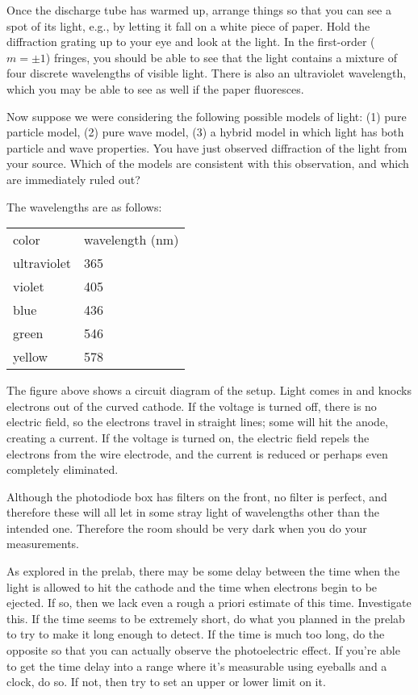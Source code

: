 Once the discharge tube has warmed up, arrange things so that you can see a spot of its light, e.g., by
letting it fall on a white piece of paper. Hold the diffraction grating up to your eye and look at the
light. In the first-order ($m=\pm1$) fringes, you should be able to see that the light contains a
mixture of four discrete wavelengths of visible light. There is also an ultraviolet wavelength,
which you may be able to see as well if the paper fluoresces.

Now suppose we were considering the following possible models of light: (1) pure particle model,
(2) pure wave model, (3) a hybrid model in which light has both particle and
wave properties. You have just observed diffraction of the light
from your source. Which of the models are consistent with this observation, and which are immediately
ruled out?

The wavelengths are as follows:\label{hg-wavelengths}

\begin{tabular}{ll}
color   &wavelength (nm)\\
ultraviolet &  365\\
violet   &405\\
blue   &436\\
green  & 546\\
yellow  & 578
\end{tabular}



The figure above shows a circuit diagram of the setup. Light comes in and knocks
electrons out of the curved cathode. If the voltage is
turned off, there is no electric field, so the electrons
travel in straight lines; some will hit the anode, creating
a current. If the voltage is
turned on, the electric field repels the electrons from the
wire electrode, and the current is reduced or perhaps even completely eliminated.

\observations

Although the photodiode box has filters on the front, no filter is perfect, and therefore these will
all let in some stray light of wavelengths other than the intended one. Therefore
the room should be very dark when you do your measurements.


As explored in the prelab, there may be some
delay between the time when the light
is allowed to hit the cathode and the time when electrons begin to be ejected.
If so, then we lack even a rough a priori estimate of this time.
Investigate this. If the time seems to be extremely short, do what you planned in the
prelab to try to make it long enough to detect. If the time is much too long, do the
opposite so that you can actually observe the photoelectric effect. If you're able to get the time
delay into a range where it's measurable using eyeballs and a clock, do so. If not,
then try to set an upper or lower limit on it.

